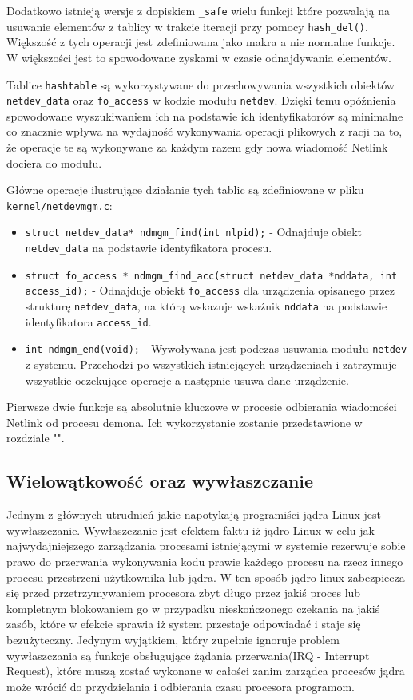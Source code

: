 \documentclass[10pt]{article}
\begin{document}
Dodatkowo istnieją wersje z dopiskiem \texttt{\_safe} wielu funkcji które pozwalają na usuwanie elementów z tablicy w trakcie iteracji przy pomocy \texttt{hash\_del()}. Większość z tych operacji jest zdefiniowana jako makra a nie normalne funkcje. W większości jest to spowodowane zyskami w czasie odnajdywania elementów.

Tablice \texttt{hashtable} są wykorzystywane do przechowywania wszystkich obiektów \texttt{netdev\_data} oraz \texttt{fo\_access} w kodzie modułu \texttt{netdev}. Dzięki temu opóźnienia spowodowane wyszukiwaniem ich na podstawie ich identyfikatorów są minimalne co znacznie wpływa na wydajność wykonywania operacji plikowych z racji na to, że operacje te są wykonywane za każdym razem gdy nowa wiadomość Netlink dociera do modułu.

Główne operacje ilustrujące działanie tych tablic są zdefiniowane w pliku \texttt{kernel/netdevmgm.c}:

\begin{itemize}
\itemsep1pt\parskip0pt
\item
  \texttt{struct netdev\_data* ndmgm\_find(int nlpid);} - Odnajduje obiekt \texttt{netdev\_data} na podstawie identyfikatora procesu.
\item
  \texttt{struct fo\_access * ndmgm\_find\_acc(struct netdev\_data *nddata, int access\_id);} - Odnajduje obiekt \texttt{fo\_access} dla urządzenia opisanego przez strukturę \texttt{netdev\_data}, na którą wskazuje wskaźnik \texttt{nddata} na podstawie identyfikatora \texttt{access\_id}.
\item
  \texttt{int ndmgm\_end(void);} - Wywoływana jest podczas usuwania modułu \texttt{netdev} z systemu. Przechodzi po wszystkich istniejących urządzeniach i zatrzymuje wszystkie oczekujące operacje a następnie usuwa dane urządzenie.
\end{itemize}

Pierwsze dwie funkcje są absolutnie kluczowe w procesie odbierania wiadomości Netlink od procesu demona. Ich wykorzystanie zostanie przedstawione w rozdziale "".

\subsection{Wielowątkowość oraz wywłaszczanie}

Jednym z głównych utrudnień jakie napotykają programiści jądra Linux jest wywłaszczanie. Wywłaszczanie jest efektem faktu iż jądro Linux w celu jak najwydajniejszego zarządzania procesami istniejącymi w systemie rezerwuje sobie prawo do przerwania wykonywania kodu prawie każdego procesu na rzecz innego procesu przestrzeni użytkownika lub jądra. W ten sposób jądro linux zabezpiecza się przed przetrzymywaniem procesora zbyt długo przez jakiś proces lub kompletnym blokowaniem go w przypadku nieskończonego czekania na jakiś zasób, które w efekcie sprawia iż system przestaje odpowiadać i staje się bezużyteczny. Jedynym wyjątkiem, który zupełnie ignoruje problem wywłaszczania są funkcje obsługujące żądania przerwania(IRQ - Interrupt Request), które muszą zostać wykonane w całości zanim zarządca procesów jądra może wrócić do przydzielania i odbierania czasu procesora programom.
\end{document}
